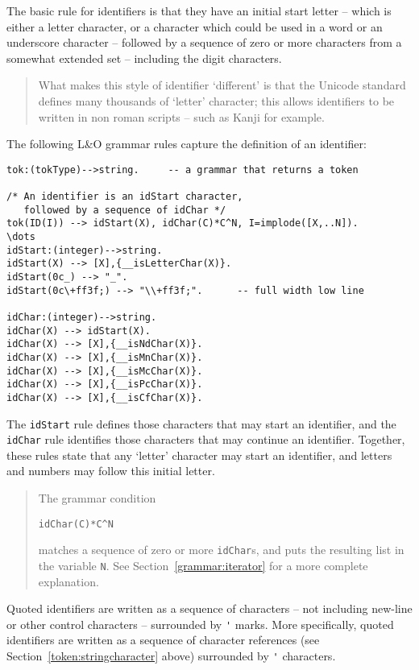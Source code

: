 The basic rule for identifiers is that they have an initial start letter -- which is either a letter character, or a character which could be used in a word or an underscore character -- followed by a sequence of zero or more characters from a somewhat extended set -- including the digit characters. 

\begin{quote}
What makes this style of identifier `different' is that the Unicode standard defines many thousands of `letter' character; this allows identifiers to be written in non roman scripts -- such as Kanji for example.
\end{quote}

The following L&O grammar rules capture the definition of an identifier:
\begin{verbatim}
tok:(tokType)-->string.		-- a grammar that returns a token

/* An identifier is an idStart character, 
   followed by a sequence of idChar */
tok(ID(I)) --> idStart(X), idChar(C)*C^N, I=implode([X,..N]).
\dots
idStart:(integer)-->string.
idStart(X) --> [X],{__isLetterChar(X)}.
idStart(0c_) --> "_".
idStart(0c\+ff3f;) --> "\\+ff3f;".		-- full width low line
  
idChar:(integer)-->string.
idChar(X) --> idStart(X).
idChar(X) --> [X],{__isNdChar(X)}.
idChar(X) --> [X],{__isMnChar(X)}.
idChar(X) --> [X],{__isMcChar(X)}.
idChar(X) --> [X],{__isPcChar(X)}.
idChar(X) --> [X],{__isCfChar(X)}.
\end{verbatim}

The \verb+idStart+ rule defines those characters that may start an identifier, and the \verb+idChar+ rule identifies those characters that may continue an identifier. Together, these rules state that any `letter' character may start an identifier, and letters and numbers may follow this initial letter. 

\begin{quote}
The grammar condition
\begin{verbatim}
idChar(C)*C^N
\end{verbatim}
matches a sequence of zero or more \verb+idChar+s, and puts the resulting list in the variable \verb+N+. See Section~\vref{grammar:iterator} for a more complete explanation.
\end{quote}

Quoted identifiers are written as a sequence of characters -- not including new-line or other control characters -- surrounded by \verb+'+ marks. More specifically, quoted identifiers are written as a sequence of character references (see Section~\ref{token:stringcharacter} above) surrounded by \verb+'+ characters.

